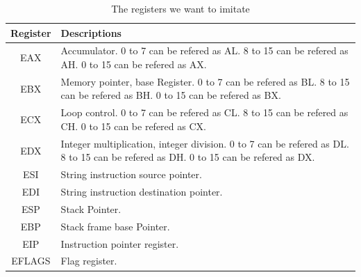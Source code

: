 \documentclass[12pt]{extarticle}
\begin{document}




        \begin{table}[h!]
            \centering
            \begin{tabular}{||c | p{9cm}||} 
             \hline
             Register & Descriptions \\ [0.5ex] 
             \hline
             EAX & Accumulator. 0 to 7 can be refered as AL. 8 to 15 can be refered as AH. 0 to 15 can be refered as AX. \\ 
             \hline
             EBX & Memory pointer, base Register. 0 to 7 can be refered as BL. 8 to 15 can be refered as BH. 0 to 15 can be refered as BX. \\
             \hline
             ECX & Loop control. 0 to 7 can be refered as CL. 8 to 15 can be refered as CH. 0 to 15 can be refered as CX. \\
             \hline
             EDX & Integer multiplication, integer division. 0 to 7 can be refered as DL. 8 to 15 can be refered as DH. 0 to 15 can be refered as DX. \\
             \hline
             ESI & String instruction source pointer. \\
             \hline
             EDI & String instruction destination pointer. \\
             \hline
             ESP & Stack Pointer. \\
             \hline
             EBP & Stack frame base Pointer. \\
             \hline
             EIP & Instruction pointer register. \\
             \hline
             EFLAGS & Flag register. \\
             \hline
            \end{tabular}
            \caption{The registers we want to imitate}
            \label{table:1}
        \end{table}
        
\end{document}
